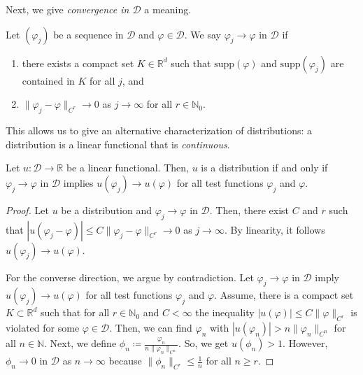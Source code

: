 Next, we give \emph{convergence in \(\mathcal{D}\)} a meaning.

\begin{definition}[Convergence]
    Let \((\varphi_j)\) be a sequence in \(\mathcal{D}\) and \(\varphi \in \mathcal{D}\). We say $
        \varphi_j \to \varphi  \text{ in \(\mathcal{D}\)}
    $
    if 
    \begin{enumerate}[label=(\roman*)]
        \item there exists a compact set \(K \in \mathbb{R}^d\) such that \(\mathrm{supp}(\varphi)\) and \(\mathrm{supp}(\varphi_j)\) are contained in \(K\) for all \(j\), and 
        \item \(\lVert \varphi_j - \varphi \rVert_{C^r} \to 0\) as \(j \to \infty\) for all \(r \in \mathbb{N}_0\).
    \end{enumerate} 
\end{definition}

This allows us to give an alternative characterization of distributions: a distribution is a linear functional that is \emph{continuous}.

\begin{lemma}
    Let \(u: \mathcal{D} \to \mathbb{R}\) be a linear functional. Then, \(u\) is a {distribution} if and only if \(\varphi_j \to \varphi\) in \(\mathcal{D}\) implies \(u(\varphi_j) \to u(\varphi)\) for all test functions \(\varphi_j\) and \(\varphi\).
\end{lemma}

\begin{proof}
    Let \(u\) be a distribution and \(\varphi_j \to \varphi\) in \(\mathcal{D}\). Then, there exist \(C\) and \(r\) such that \(|u(\varphi_j -\varphi)| \leq C \lVert \varphi_j - \varphi \rVert_{C^r} \to 0\) as \(j \to \infty\). By linearity, it follows \(u(\varphi_j) \to u(\varphi)\).

    For the converse direction, we argue by contradiction. Let \(\varphi_j \to \varphi\) in \(\mathcal{D}\) imply \(u(\varphi_j) \to u(\varphi)\) for all test functions \(\varphi_j\) and \(\varphi\). Assume, there is a compact set \(K \subset \mathbb{R}^d\) such that for all \(r \in \mathbb{N}_0\) and \(C < \infty\) the inequality \(|u(\varphi)| \leq C \lVert\varphi\rVert_{C^r}\) is violated for some \(\varphi \in \mathcal{D}\). Then, we can find \(\varphi_n\) with \(|u(\varphi_n)| > n \lVert \varphi_n \rVert_{C^n}\) for all \(n \in \mathbb{N}\). Next, we define \(\phi_n \coloneqq \frac{\varphi_n}{n \lVert \varphi_n \rVert_{C^n}}\). So, we get \(u(\phi_n) > 1\). However, \(\phi_n \to 0\) in \(\mathcal{D}\) as \(n \to \infty\) because \(\lVert \phi_n \rVert_{C^r} \leq \frac{1}{n}\) for all \(n \geq r\).
\end{proof}

